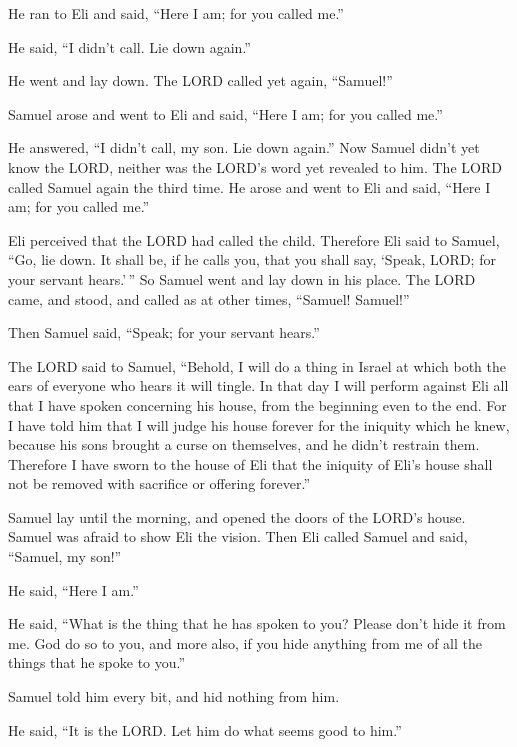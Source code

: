  He ran to Eli and said, ``Here I am; for you called me.''

He said, ``I didn't call. Lie down again.''

He went and lay down.  The LORD called yet again,
``Samuel!''

Samuel arose and went to Eli and said, ``Here I am; for you called me.''

He answered, ``I didn't call, my son. Lie down again.'' 
Now Samuel didn't yet know the LORD, neither was the LORD's word yet
revealed to him.  The LORD called Samuel again the third
time. He arose and went to Eli and said, ``Here I am; for you called
me.''

Eli perceived that the LORD had called the child. 
Therefore Eli said to Samuel, ``Go, lie down. It shall be, if he calls
you, that you shall say, `Speak, LORD; for your servant hears.'\,'' So
Samuel went and lay down in his place.  The LORD came,
and stood, and called as at other times, ``Samuel! Samuel!''

Then Samuel said, ``Speak; for your servant hears.''

 The LORD said to Samuel, ``Behold, I will do a thing in
Israel at which both the ears of everyone who hears it will tingle.
 In that day I will perform against Eli all that I have
spoken concerning his house, from the beginning even to the end.
 For I have told him that I will judge his house forever
for the iniquity which he knew, because his sons brought a curse on
themselves, and he didn't restrain them.  Therefore I
have sworn to the house of Eli that the iniquity of Eli's house shall
not be removed with sacrifice or offering forever.''

 Samuel lay until the morning, and opened the doors of
the LORD's house. Samuel was afraid to show Eli the vision.
 Then Eli called Samuel and said, ``Samuel, my son!''

He said, ``Here I am.''

 He said, ``What is the thing that he has spoken to you?
Please don't hide it from me. God do so to you, and more also, if you
hide anything from me of all the things that he spoke to you.''

 Samuel told him every bit, and hid nothing from him.

He said, ``It is the LORD. Let him do what seems good to him.''

